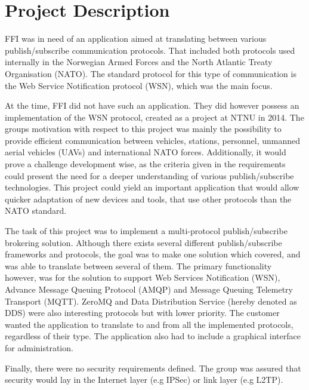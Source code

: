 \section{Project Description}
\label{sec:introduction-project_description}

FFI was in need of an application aimed at translating between various publish/subscribe communication protocols. That included both protocols used internally in the Norwegian Armed Forces and the North Atlantic Treaty Organisation (NATO). The standard protocol for this type of communication is the Web Service Notification protocol (WSN), which was the main focus.

At the time, FFI did not have such an application. They did however possess an implementation of the WSN protocol, created as a project at NTNU in 2014. The groups motivation with respect to this project was mainly the possibility to provide efficient communication between vehicles, stations, personnel, unmanned aerial vehicles (UAVs) and international NATO forces. Additionally, it would prove a challenge development wise, as the criteria given in the requirements could present the need for a  deeper understanding of various publish/subscribe technologies. This project could yield an important application that would allow quicker adaptation of new devices and tools, that use other protocols than the NATO standard.

The task of this project was to implement a multi-protocol publish/subscribe brokering solution. Although there exists several different publish/subscribe frameworks and protocols, the goal was to make one solution which covered, and was able to translate between several of them. The primary functionality however, was for the solution to support Web Services Notification (WSN), Advance Message Queuing Protocol (AMQP) and Message Queuing Telemetry Transport (MQTT). ZeroMQ and Data Distribution Service (hereby denoted as DDS) were also interesting protocols but with lower priority. The customer wanted the application to translate to and from all the implemented protocols, regardless of their type. The application also had to include a graphical interface for administration.

Finally, there were no security requirements defined. The group was assured that security would lay in the Internet layer (e.g IPSec) or link layer (e.g L2TP).


\clearpage